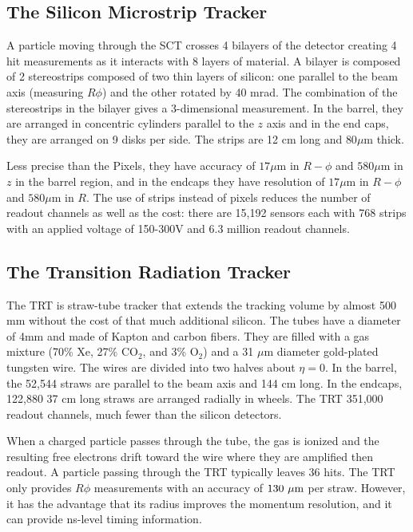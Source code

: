 \subsection{The Silicon Microstrip Tracker}
A particle moving through the \ac{SCT} crosses 4 bilayers of the detector creating 4 hit measurements as it interacts with 8 layers of material. A  bilayer is composed of 2 stereostrips composed of two thin layers of silicon: one parallel to the beam axis (measuring $R\phi$) and the other rotated by 40 mrad. The combination of the stereostrips in the bilayer gives a 3-dimensional measurement. In the barrel, they are arranged in concentric cylinders parallel to the $z$ axis and in the end caps, they are arranged on 9 disks per side. The strips are 12 cm long and $80 \mu\textrm{m}$ thick.

Less precise than the Pixels, they have accuracy of $17 \mu \textrm{m}$ in $R-\phi$ and $580 \mu \textrm{m}$ in $z$ in the barrel region, and in the endcaps they have resolution of $17 \mu \textrm{m}$ in $R-\phi$ and $580 \mu \textrm{m}$ in $R$. The use of strips instead of pixels reduces the number of readout channels as well as the cost: there are 15,192 sensors each with 768 strips with an applied voltage of 150-300V and 6.3 million readout channels.
 

\subsection{The Transition Radiation Tracker}
The \ac{TRT} is straw-tube tracker that extends the tracking volume by almost 500 mm without the cost of that much additional silicon. The tubes have a diameter of 4mm and made of Kapton and carbon fibers. They are filled with a gas mixture (70\% Xe, 27\% CO$_{2}$, and 3\% O$_{2}$) and a 31 $\mu$m diameter gold-plated tungsten wire. The wires are divided into two halves about $\eta = 0$. In the barrel, the 52,544 straws are parallel to the beam axis and 144 cm long. In the endcaps, 122,880 37 cm long straws are arranged radially in wheels. The \ac{TRT} 351,000 readout channels, much fewer than the silicon detectors.

When a charged particle passes through the tube, the gas is ionized and the resulting free electrons drift toward the wire where they are amplified then readout. A particle passing through the \ac{TRT} typically leaves 36 hits. The \ac{TRT} only provides $R\phi$ measurements with an accuracy of $130~\mu\text{m}$ per straw. However, it has the advantage that its radius improves the momentum resolution, and it  can provide ns-level timing information.


